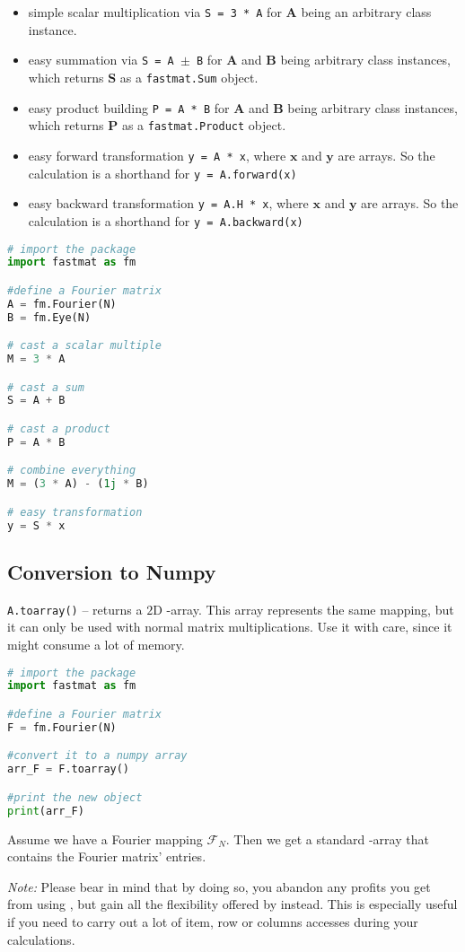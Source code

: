 \begin{itemize}
 \item simple scalar multiplication via \texttt{S = 3 * A} for $\bm A$ being an arbitrary \fm{} class instance.
 \item easy summation via \texttt{S = A $\pm$ B} for $\bm A$ and $\bm B$ being arbitrary \fm{} class instances, which returns $\bm S$ as a \texttt{fastmat.Sum} object.
 \item easy product building \texttt{P = A * B} for $\bm A$ and $\bm B$ being arbitrary \fm{} class instances, which returns $\bm P$ as a \texttt{fastmat.Product} object.
 \item easy forward transformation \texttt{y = A * x}, where $\bm x$ and $\bm y$ are \np{} arrays. So the calculation is a shorthand for \texttt{y = A.forward(x)}
 \item easy backward transformation \texttt{y = A.H * x}, where $\bm x$ and $\bm y$ are \np{} arrays. So the calculation is a shorthand for \texttt{y = A.backward(x)}
\end{itemize}

\begin{snippet}
\begin{lstlisting}[language=Python]
# import the package
import fastmat as fm

#define a Fourier matrix
A = fm.Fourier(N)
B = fm.Eye(N)

# cast a scalar multiple
M = 3 * A

# cast a sum
S = A + B

# cast a product
P = A * B

# combine everything
M = (3 * A) - (1j * B)

# easy transformation
y = S * x
\end{lstlisting}
\end{snippet}

%
%
%
\subsection{Conversion to Numpy}
\texttt{A.toarray()} -- returns a $2$D \np{}-array. This array represents the same mapping, but it can only be used with normal matrix multiplications. Use it with care, since it might consume a lot of memory.

\begin{snippet}
\begin{lstlisting}[language=Python]
# import the package
import fastmat as fm

#define a Fourier matrix
F = fm.Fourier(N)

#convert it to a numpy array
arr_F = F.toarray()

#print the new object
print(arr_F)
\end{lstlisting}

Assume we have a Fourier mapping $\bm{\mathcal{F}}_N$. Then we get a standard \np{}-array that contains the Fourier matrix' entries.
\end{snippet}
%
\textit{Note:} Please bear in mind that by doing so, you abandon any profits you get from using \fm{}, but gain all the flexibility offered by \np{} instead. This is especially useful if you need to carry out a lot of item, row or columns accesses during your calculations. 
